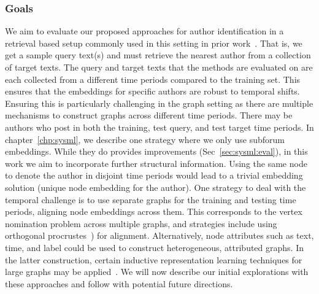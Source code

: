 \subsubsection{Goals}
We aim to evaluate our proposed approaches for author identification in a retrieval based setup commonly used in this setting in prior work~\cite{andrews2019learning,riverastao2021learning,khan2021deep,maneriker2021sysml}.
That is, we get a sample query text(s) and must retrieve the nearest author from a collection of target texts.
The query and target texts that the methods are evaluated on are each collected from a different time periods compared to the training set.
This ensures that the embeddings for specific authors are robust to temporal shifts.
Ensuring this is particularly challenging in the graph setting as there are multiple mechanisms to construct graphs across different time periods.
There may be authors who post in both the training, test query, and test target time periods.
In chapter~\ref{chp:sysml}, we describe one strategy where we only use subforum embeddings.
While they do provides improvements (Sec~\ref{sec:sysml:eval}), in this work we aim to incorporate further structural information.
Using the same node to denote the author in disjoint time periods would lead to a trivial embedding solution (unique node embedding for the author).
One strategy to deal with the temporal challenge is to use separate graphs for the training and testing time periods, aligning node embeddings across them.
This corresponds to the vertex nomination problem across multiple graphs, and strategies include using orthogonal procrustes~\cite{agterberg2020vertex}) for alignment.
Alternatively, node attributes such as text, time, and label could be used to construct heterogeneous, attributed graphs.
In the latter construction, certain inductive representation learning techniques for large graphs may be applied~\cite{hamilton2017inductive,xu2020inductive}.
We will now describe our initial explorations with these approaches and follow with potential future directions.

